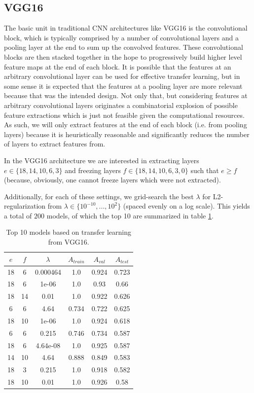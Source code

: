 \subsection{VGG16}

The basic unit in traditional \ac{CNN} architectures like VGG16 is the convolutional block, which is typically comprised by a number of convolutional layers and a pooling layer at the end to sum up the convolved features. These convolutional blocks are then stacked together in the hope to progressively build higher level feature maps at the end of each block. It is possible that the features at an arbitrary convolutional layer can be used for effective transfer learning, but in some sense it is expected that the features at a pooling layer are more relevant because that was the intended design. Not only that, but considering features at arbitrary convolutional layers originates a combinatorial explosion of possible feature extractions which is just not feasible given the computational resources. As such, we will only extract features at the end of each block (i.e. from pooling layers) because it is heuristically reasonable and significantly reduces the number of layers to extract features from.

In the VGG16 architecture we are interested in extracting layers $e \in \{18,14,10,6,3\}$ and freezing layers $f \in \{18,14,10,6,3,0\}$ such that $e \geq f$ (because, obviously, one cannot freeze layers which were not extracted).

Additionally, for each of these settings, we grid-search the best $\lambda$ for L2-regularization from $\lambda \in \{10^{-10}, ..., 10^{2}\}$ (spaced evenly on a log scale). This yields a total of $200$ models, of which the top 10 are summarized in table \ref{table:vgg16_top10}.

\begin{table}[ht]
\centering
\begin{tabular}{ |c|c|c|c|c|c| }
\hline
$e$ & $f$ & $\lambda$ & $A_{train}$ & $A_{val}$ & $A_{test}$ \\
\hline
18 & 6 & 0.000464 & 1.0 & 0.924 & 0.723 \\
18 & 6 & 1e-06 & 1.0 & 0.93 & 0.66 \\
18 & 14 & 0.01 & 1.0 & 0.922 & 0.626 \\
6 & 6 & 4.64 & 0.734 & 0.722 & 0.625 \\
18 & 10 & 1e-06 & 1.0 & 0.924 & 0.618 \\
6 & 6 & 0.215 & 0.746 & 0.734 & 0.587 \\
18 & 6 & 4.64e-08 & 1.0 & 0.925 & 0.587 \\
14 & 10 & 4.64 & 0.888 & 0.849 & 0.583 \\
18 & 3 & 0.215 & 1.0 & 0.918 & 0.582 \\
18 & 10 & 0.01 & 1.0 & 0.926 & 0.58 \\
\hline
\end{tabular}
\caption{Top 10 models based on transfer learning from VGG16.}
\label{table:vgg16_top10}
\end{table}

